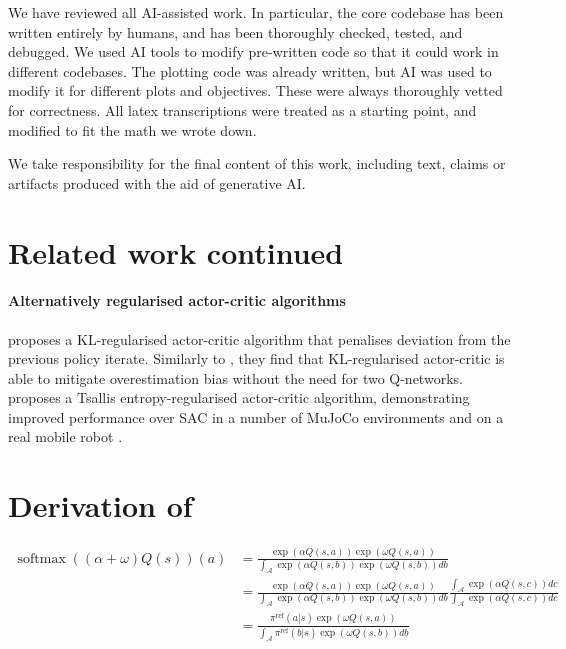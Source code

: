 \documentclass{article} %
\begin{document}
We have reviewed all AI-assisted work. In particular, the core codebase has been written entirely by humans, and has been thoroughly checked, tested, and debugged. We used AI tools to modify pre-written code so that it could work in different codebases. The plotting code was already written, but AI was used to modify it for different plots and objectives. These were always thoroughly vetted for correctness. All latex transcriptions were treated as a starting point, and modified to fit the math we wrote down. 

We take responsibility for the final content of this work,
including text, claims or artifacts produced with the aid of generative AI.




\clearpage
\appendix

\section{Related work continued} \label{app:related_work_cont}

    \paragraph{Alternatively regularised actor-critic algorithms}
        \citet{gong_KL_actor_critic_prev_policy} proposes a KL-regularised actor-critic algorithm that penalises deviation from the previous policy iterate. Similarly to \citet{kim2019deepmellow_mellowmax_no_target}, they find that KL-regularised actor-critic is able to mitigate overestimation bias without the need for two Q-networks.
        \citet{lee2020_tsallis_actor_critic_robotics} proposes a Tsallis entropy-regularised actor-critic algorithm, demonstrating improved performance over SAC in a number of MuJoCo environments and on a real mobile robot \citep{todorov2012mujoco}.

\section{Derivation of \ourMethod} \label{appendix:SMM_AC_DERIVATION}
    \begin{align*}
        \operatorname{softmax}((\alpha+\omega) Q(s))(a) &= \frac{\exp(\alpha Q(s,a)) \exp(\omega Q(s,a))}{\int_\mathcal{A}\exp(\alpha Q(s,b)) \exp(\omega Q(s,b)) db} \\
        &= \frac{\exp(\alpha Q(s,a)) \exp(\omega Q(s,a))}{\int_\mathcal{A}\exp(\alpha Q(s,b)) \exp(\omega Q(s,b)) db} \frac{\int_\mathcal{A}\exp(\alpha Q(s,c))dc}{\int_\mathcal{A}\exp(\alpha Q(s,c))dc} \\
        &= \frac{\pi^\text{ref}(a|s) \exp(\omega Q(s,a))}{\int_\mathcal{A}\pi^\text{ref}(b|s) \exp(\omega Q(s,b)) db}
    \end{align*}
\end{document}
